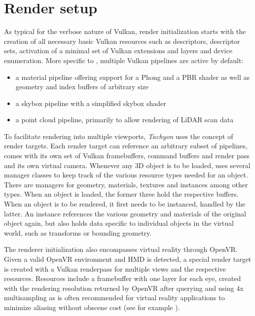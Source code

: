 \section{Render setup} 
As typical for the verbose nature of Vulkan, render initialization starts with the creation of all necessary basic Vulkan resources such as descriptors, descriptor sets, activation of a minimal set of Vulkan extensions and layers and device enumeration. 
More specific to , multiple Vulkan pipelines are active by default:
\begin{itemize}
\item a material pipeline offering support for a Phong and a PBR shader as well as geometry and index buffers of arbitrary size
\item a skybox pipeline with a simplified skybox shader
\item a point cloud pipeline, primarily to allow rendering of LiDAR scan data
\end{itemize}
To facilitate rendering into multiple viewports, \textit{Tachyon} uses the concept of render targets. Each render target can reference an arbitrary subset of pipelines, comes with its own set of Vulkan framebuffers, command buffers and render pass and its own virtual camera. 
Whenever any 3D object is to be loaded,  uses several manager classes to keep track of the various resource types needed for an object. There are managers for geometry, materials, textures and instances among other types. When an object is loaded, the former three hold the respective buffers. When an object is to be rendered, it first needs to be instanced, handled by the latter. An instance references the various geometry and materials of the original object again, but also holds data specific to individual objects in the virtual world, such as transforms or bounding geometry. 

The renderer initialization also encompasses virtual reality through OpenVR. Given a valid OpenVR environment and HMD is detected, a special render target is created with a Vulkan renderpass for multiple views and the respective resources. Resources include a framebuffer with one layer for each eye, created with the rendering resolution returned by OpenVR after querying  and using 4x multisampling as is often recommended for virtual reality applications to minimize aliasing without obscene cost (see for example \cite{Porter.2017}\cite{Carmack.2016}\cite{VisCircleGmbH.2018}\cite{Pettit.2017}). 

